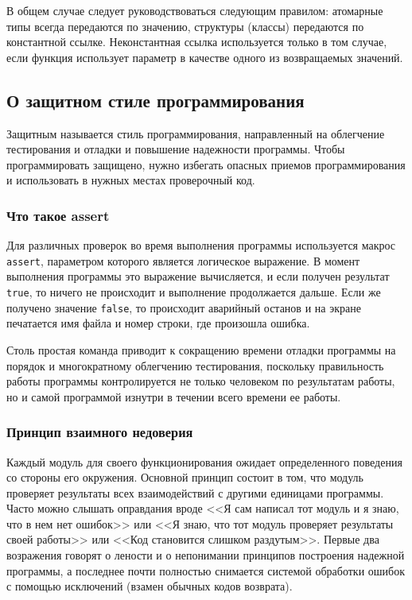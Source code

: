 В общем случае следует руководствоваться следующим правилом: атомарные типы всегда передаются по значению, структуры (классы) передаются по константной ссылке. Неконстантная ссылка используется только в том случае, если функция использует параметр в качестве одного из возвращаемых значений.

\newpage
\subsection{О защитном стиле программирования}

Защитным называется стиль программирования, направленный на облегчение тестирования и отладки и повышение надежности программы. Чтобы программировать защищено, нужно избегать опасных приемов программирования и использовать в нужных местах проверочный код.

\subsubsection{Что такое assert} \label{subsubsection:assert}

Для различных проверок во время выполнения программы используется макрос \lstinline|assert|, параметром которого является логическое выражение. В момент выполнения программы это выражение вычисляется, и если получен результат \lstinline|true|, то ничего не происходит и выполнение продолжается дальше. Если же получено значение \lstinline|false|, то происходит аварийный останов и на экране печатается имя файла и номер строки, где произошла ошибка.

Столь простая команда приводит к сокращению времени отладки программы на порядок и многократному облегчению тестирования, поскольку правильность работы программы контролируется не только человеком по результатам работы, но и самой программой изнутри в течении всего времени ее работы.

\subsubsection{Принцип взаимного недоверия}

Каждый модуль для своего функционирования ожидает определенного поведения со стороны его окружения. Основной принцип состоит в том, что модуль проверяет результаты всех взаимодействий с другими единицами программы. Часто можно слышать оправдания вроде <<Я сам написал тот модуль и я знаю, что в нем нет ошибок>> или <<Я знаю, что тот модуль проверяет результаты своей работы>> или <<Код становится слишком раздутым>>. Первые два возражения говорят о лености и о непонимании принципов построения надежной программы, а последнее почти полностью снимается системой обработки ошибок с помощью исключений (взамен обычных кодов возврата).

